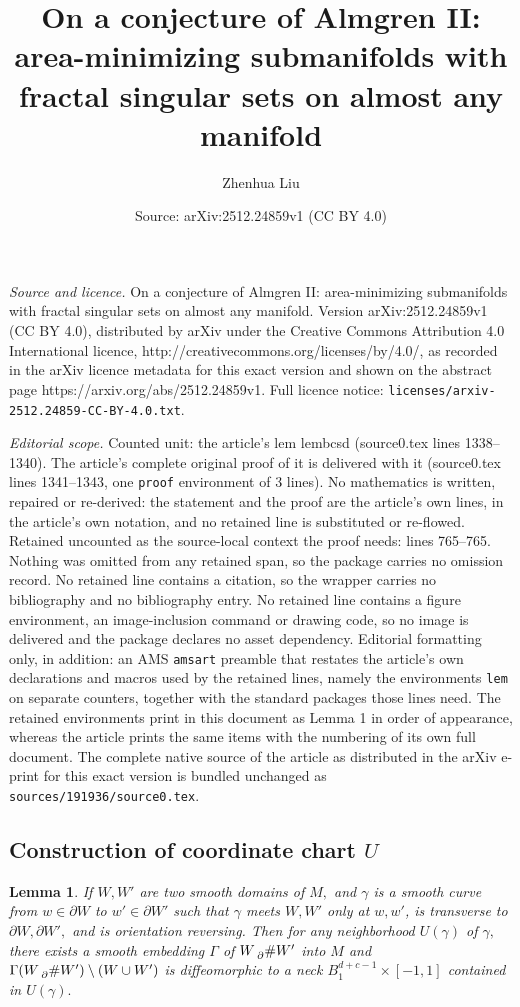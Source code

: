 \documentclass[10pt,a4paper]{amsart}
\title{On a conjecture of Almgren II: area-minimizing submanifolds with fractal singular sets on almost any manifold}
\author{Zhenhua Liu}
\date{Source: arXiv:2512.24859v1 (CC BY 4.0)}
\newtheorem{lem}{Lemma}
\newcommand{\Ga}{\Gamma}
\newcommand{\bcs}{\prescript{}{\pd}{\#}}
\newcommand{\ga}{\gamma}
\newcommand{\pd}{\partial}
\begin{document}
\maketitle

\noindent\emph{Source and licence.} On a conjecture of Almgren II: area-minimizing submanifolds with fractal singular sets on almost any manifold. Version arXiv:2512.24859v1 (CC BY 4.0), distributed by arXiv under the Creative Commons Attribution 4.0 International licence, http://creativecommons.org/licenses/by/4.0/, as recorded in the arXiv licence metadata for this exact version and shown on the abstract page https://arxiv.org/abs/2512.24859v1. Full licence notice: \texttt{licenses/arxiv-2512.24859-CC-BY-4.0.txt}.\par\smallskip

\noindent\textit{Editorial scope.} Counted unit: the article's lem lembcsd (source0.tex lines 1338--1340). The article's complete original proof of it is delivered with it (source0.tex lines 1341--1343, one \texttt{proof} environment of 3 lines). No mathematics is written, repaired or re-derived: the statement and the proof are the article's own lines, in the article's own notation, and no retained line is substituted or re-flowed.  Retained uncounted as the source-local context the proof needs: lines 765--765.  Nothing was omitted from any retained span, so the package carries no omission record.  No retained line contains a citation, so the wrapper carries no bibliography and no bibliography entry.  No retained line contains a figure environment, an image-inclusion command or drawing code, so no image is delivered and the package declares no asset dependency.  Editorial formatting only, in addition: an AMS \texttt{amsart} preamble that restates the article's own declarations and macros used by the retained lines, namely the environments \texttt{lem} on separate counters, together with the standard packages those lines need.  The retained environments print in this document as Lemma 1 in order of appearance, whereas the article prints the same items with the numbering of its own full document.  The complete native source of the article as distributed in the arXiv e-print for this exact version is bundled unchanged as \texttt{sources/191936/source0.tex}.
	\subsection{Construction of coordinate chart $U$}\label{seccht}

	\begin{lem}\label{lembcsd}
		If $W,W'$ are two smooth domains of $M,$ and $\ga$ is a smooth curve from $w\in \pd W$ to $w'\in \pd W'$ such that $\ga$ meets $W,W'$ only at $w,w'$, is transverse to $\pd W,\pd W',$ and is orientation reversing. Then for any neighborhood $U(\ga)$ of $\ga,$ there exists a smooth embedding $\Ga$ of $W\bcs W'$ into $M$ and $\Ga(W\bcs W')\setminus (W\cup W')$ is diffeomorphic to a neck $B_1^{d+c-1}\times[-1,1]$ contained in $U(\ga).$
	\end{lem}
\end{document}

